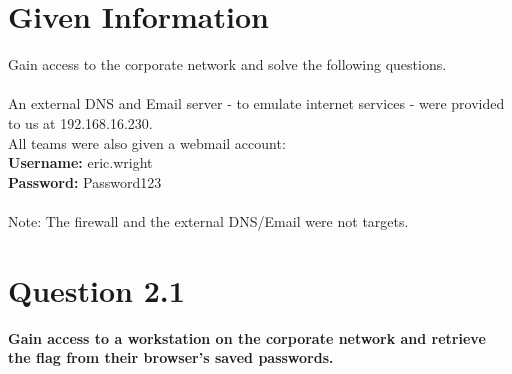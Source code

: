 \section{Given Information}
Gain access to the corporate network and solve the following questions.
\\\\
An external DNS and Email server - to emulate internet services - were provided
to us at 192.168.16.230.\\
All teams were also given a webmail account:\\
\textbf{Username:} eric.wright
\\
\textbf{Password:} Password123
\\\\
Note: The firewall and the external DNS/Email were not targets.

\section{Question 2.1}
\textbf{Gain access to a workstation on the corporate network and retrieve the
flag from their browser's saved passwords.}
